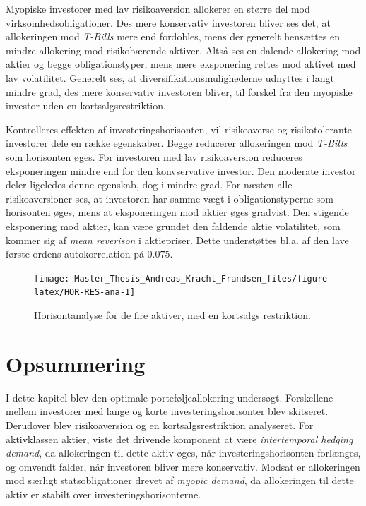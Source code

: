 \documentclass[
  a4paper,
  oneside]{memoir}
\begin{document}
Myopiske investorer med lav risikoaversion allokerer en større del mod virksomhedsobligationer. Des mere konservativ investoren bliver ses det, at allokeringen mod \emph{T-Bills} mere end fordobles, mens der generelt hensættes en mindre allokering mod risikobærende aktiver. Altså ses en dalende allokering mod aktier og begge obligationstyper, mens mere eksponering rettes mod aktivet med lav volatilitet. Generelt ses, at diversifikationsmulighederne udnyttes i langt mindre grad, des mere konservativ investoren bliver, til forskel fra den myopiske investor uden en kortsalgsrestriktion.

Kontrolleres effekten af investeringshorisonten, vil risikoaverse og risikotolerante investorer dele en række egenskaber. Begge reducerer allokeringen mod \emph{T-Bills} som horisonten øges. For investoren med lav risikoaversion reduceres eksponeringen mindre end for den konvservative investor. Den moderate investor deler ligeledes denne egenskab, dog i mindre grad. For næsten alle risikoaversioner ses, at investoren har samme vægt i obligationstyperne som horisonten øges, mens at eksponeringen mod aktier øges gradvist. Den stigende eksponering mod aktier, kan være grundet den faldende aktie volatilitet, som kommer sig af \emph{mean reverison} i aktiepriser. Dette understøttes bl.a. af den lave første ordens autokorrelation på \(0.075\).\\

\begin{figure}[H]

{\centering \texttt{[image: Master\_Thesis\_Andreas\_Kracht\_Frandsen\_files/figure-latex/HOR-RES-ana-1]} 

}

\caption{Horisontanalyse for de fire aktiver, med en kortsalgs restriktion.}\label{fig:HOR-RES-ana}
\end{figure}

\hypertarget{opsummering-4}{%
\section{Opsummering}\label{opsummering-4}}

I dette kapitel blev den optimale porteføljeallokering undersøgt. Forskellene mellem investorer med lange og korte investeringshorisonter blev skitseret. Derudover blev risikoaversion og en kortsalgsrestriktion analyseret. For aktivklassen aktier, viste det drivende komponent at være \emph{intertemporal hedging demand}, da allokeringen til dette aktiv øges, når investeringshorisonten forlænges, og omvendt falder, når investoren bliver mere konservativ. Modsat er allokeringen mod særligt statsobligationer drevet af \emph{myopic demand}, da allokeringen til dette aktiv er stabilt over investeringshorisonterne.
\end{document}
